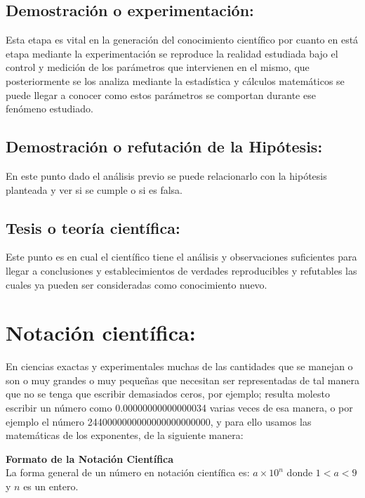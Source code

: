 \documentclass[a5paper,pagesize,10pt,bibtotoc,pointlessnumbers,
normalheadings,DIV=9,fleqn,x11names,table,twoside=false]{scrbook}
\begin{document}
\subsection{Demostración o experimentación:}

Esta etapa es vital en la generación del conocimiento científico por cuanto en está etapa mediante la experimentación se reproduce 
la realidad estudiada bajo el control y medición de los parámetros que intervienen en el mismo, que posteriormente se los analiza 
mediante la estadística y cálculos 
matemáticos se puede llegar a conocer como estos parámetros se comportan durante ese fenómeno estudiado.

\subsection{Demostración o refutación de la Hipótesis:}

En este punto dado el análisis previo se puede relacionarlo con la hipótesis planteada y ver si se cumple o si es falsa.

\subsection{Tesis o teoría científica:}

Este punto es en cual el científico tiene el análisis y observaciones suficientes para llegar a conclusiones y establecimientos de 
verdades reproducibles y refutables las cuales ya pueden ser consideradas como conocimiento nuevo. 

\section{Notación científica:}

En ciencias exactas y experimentales muchas de las cantidades que se manejan o son o muy grandes o muy pequeñas que 
necesitan ser representadas de tal manera que no se tenga que escribir demasiados ceros, por ejemplo; resulta molesto escribir un 
número como 0.00000000000000034 varias veces de esa manera, o por ejemplo el número 2440000000000000000000000, y para ello usamos 
las matemáticas de los exponentes, de 
la siguiente manera:

\begin{tcolorbox}
\textbf{Formato de la Notación Científica}\\

La forma general de un número en notación científica es: $a\times 10^n$ donde $1<a<9$ y $n$ es un entero.\\
\end{tcolorbox}
\end{document}
